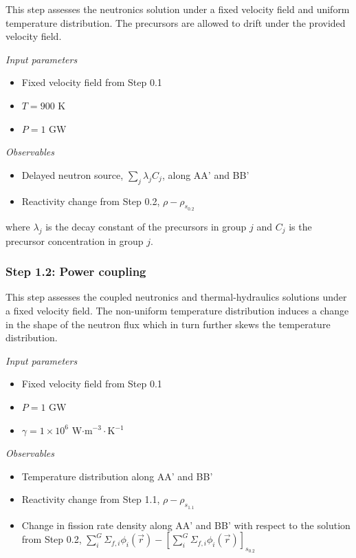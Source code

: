 This step assesses the neutronics solution under a fixed velocity field and
uniform temperature distribution. The precursors are allowed to drift under the
provided velocity field.

\textit{Input parameters}
%
\begin{itemize}
    \itemsep0em
    \item Fixed velocity field from Step 0.1
    \item $T = 900$ K
    \item $P = 1$ GW
\end{itemize}

\textit{Observables}
\begin{itemize}
    \itemsep0em
    \item Delayed neutron source, $\sum_j \lambda_j C_j$, along AA' and BB'
    \item Reactivity change from Step 0.2, $\rho - \rho_{s_{0.2}}$
\end{itemize}
where $\lambda_j$ is the decay constant of the precursors in group $j$ and
$C_j$ is the precursor concentration in group $j$.

\subsubsection{Step 1.2: Power coupling}

This step assesses the coupled neutronics and thermal-hydraulics solutions
under a fixed velocity field. The non-uniform temperature distribution induces
a change in the shape of the neutron flux which in turn further skews the
temperature distribution.

\textit{Input parameters}
%
\begin{itemize}
    \itemsep0em
    \item Fixed velocity field from Step 0.1
    \item $P = 1$ GW
    \item $\gamma = 1 \times 10^6$ W$\cdot$m$^{-3}\cdot$K$^{-1}$
\end{itemize}

\textit{Observables}
\begin{itemize}
    \itemsep0em
    \item Temperature distribution along AA' and BB'
    \item Reactivity change from Step 1.1, $\rho - \rho_{s_{1.1}}$
    \item Change in fission rate density along AA' and BB' with respect to the
    solution from Step 0.2, $\sum^G_i \Sigma_{f,i} \phi_i(\vec{r}) -
    \left[\sum^G_i \Sigma_{f,i} \phi_i(\vec{r})\right]_{s_{0.2}}$
\end{itemize}

